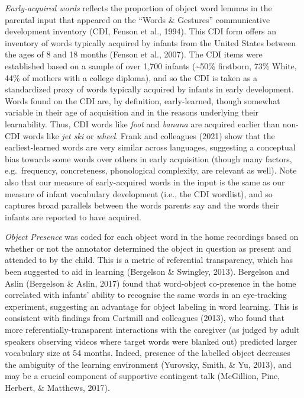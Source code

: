 \documentclass[
  english,
  man,floatsintext]{apa6}
\begin{document}
\emph{Early-acquired words} reflects the proportion of object word lemmas in the parental input that appeared on the \enquote{Words \& Gestures} communicative development inventory (CDI, Fenson et al., 1994). This CDI form offers an inventory of words typically acquired by infants from the United States between the ages of 8 and 18 months (Fenson et al., 2007). The CDI items were established based on a sample of over 1,700 infants (\textasciitilde50\% firstborn, 73\% White, 44\% of mothers with a college diploma), and so the CDI is taken as a standardized proxy of words typically acquired by infants in early development. Words found on the CDI are, by definition, early-learned, though somewhat variable in their age of acquisition and in the reasons underlying their learnability. Thus, CDI words like \emph{foot} and \emph{banana} are acquired earlier than non-CDI words like \emph{jet ski} or \emph{wheel}. Frank and colleagues (2021) show that the earliest-learned words are very similar across languages, suggesting a conceptual bias towards some words over others in early acquisition (though many factors, e.g.~frequency, concreteness, phonological complexity, are relevant as well). Note also that our measure of early-acquired words in the input is the same as our measure of infant vocabulary development (i.e., the CDI wordlist), and so captures broad parallels between the words parents say and the words their infants are reported to have acquired.

\emph{Object Presence} was coded for each object word in the home recordings based on whether or not the annotator determined the object in question as present and attended to by the child. This is a metric of referential transparency, which has been suggested to aid in learning (Bergelson \& Swingley, 2013). Bergelson and Aslin (Bergelson \& Aslin, 2017) found that word-object co-presence in the home correlated with infants' ability to recognise the same words in an eye-tracking experiment, suggesting an advantage for object labeling in word learning. This is consistent with findings from Cartmill and colleagues (2013), who found that more referentially-transparent interactions with the caregiver (as judged by adult speakers observing videos where target words were blanked out) predicted larger vocabulary size at 54 months. Indeed, presence of the labelled object decreases the ambiguity of the learning environment (Yurovsky, Smith, \& Yu, 2013), and may be a crucial component of supportive contingent talk (McGillion, Pine, Herbert, \& Matthews, 2017).
\end{document}
